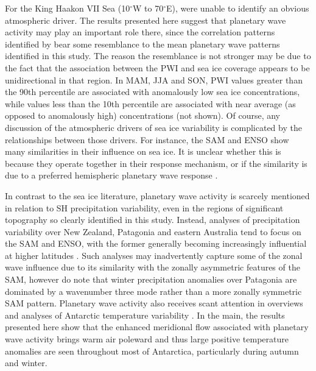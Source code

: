 For the King Haakon VII Sea (10$^{\circ}$W to 70$^{\circ}$E), \citet{Raphael2014} were unable to identify an obvious atmospheric driver. The results presented here suggest that planetary wave activity may play an important role there, since the correlation patterns identified by \citet{Raphael2014} bear some resemblance to the mean planetary wave patterns identified in this study. The reason the resemblance is not stronger may be due to the fact that the association between the PWI and sea ice coverage appears to be unidirectional in that region. In MAM, JJA and SON, PWI values greater than the 90th percentile are associated with anomalously low sea ice concentrations, while values less than the 10th percentile are associated with near average (as opposed to anomalously high) concentrations (not shown). Of course, any discussion of the atmospheric drivers of sea ice variability is complicated by the relationships between those drivers. For instance, the SAM and ENSO show many similarities in their influence on sea ice. It is unclear whether this is because they operate together in their response mechanism, or if the similarity is due to a preferred hemispheric planetary wave response \citep[e.g.][]{Pezza2012}. 

In contrast to the sea ice literature, planetary wave activity is scarcely mentioned in relation to SH precipitation variability, even in the regions of significant topography so clearly identified in this study. Instead, analyses of precipitation variability over New Zealand, Patagonia and eastern Australia tend to focus on the SAM and ENSO, with the former generally becoming increasingly influential at higher latitudes \citep[e.g.][]{Ummenhofer2007,Aravena2009,Kidston2009,Risbey2009,Garreaud2013,Jiang2013}. Such analyses may inadvertently capture some of the zonal wave influence due to its similarity with the zonally asymmetric features of the SAM, however \citet{Garreaud2013} do note that winter precipitation anomalies over Patagonia are dominated by a wavenumber three mode rather than a more zonally symmetric SAM pattern. Planetary wave activity also receives scant attention in overviews and analyses of Antarctic temperature variability \citep[e.g.][]{Russell2010,SchneiderOkumura2012,Yu2012}. In the main, the results presented here show that the enhanced meridional flow associated with planetary wave activity brings warm air poleward and thus large positive temperature anomalies are seen throughout most of Antarctica, particularly during autumn and winter. 
